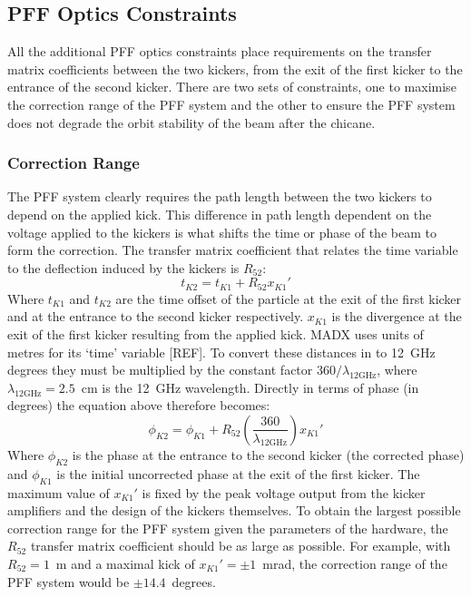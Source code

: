 \subsection{PFF Optics Constraints}
\label{ss:pffOpticsReqs}

All the additional PFF optics constraints place requirements on the transfer matrix coefficients between the two kickers, from the exit of the first kicker to the entrance of the second kicker. There are two sets of constraints, one to maximise the correction range of the PFF system and the other to ensure the PFF system does not degrade the orbit stability of the beam after the chicane.

\subsubsection{Correction Range}

The PFF system clearly requires the path length between the two kickers to depend on the applied kick. This difference in path length dependent on the voltage applied to the kickers is what shifts the time or phase of the beam to form the correction. The transfer matrix coefficient that relates the time variable to the deflection induced by the kickers is \(R_{52}\):
\begin{equation}
t_{K2} = t_{K1} + R_{52}x_{K1}'
\end{equation}
Where \(t_{K1}\) and \(t_{K2}\) are the time offset of the particle at the exit of the first kicker and at the entrance to the second kicker respectively. \(x_{K1}\) is the divergence at the exit of the first kicker resulting from the applied kick. MADX uses units of metres for its `time' variable [REF]. To convert these distances in to 12~GHz degrees they must be multiplied by the constant factor \(360/\lambda_{\mathrm{12GHz}}\), where \(\lambda_{\mathrm{12GHz}} = 2.5\)~cm is the 12~GHz wavelength. Directly in terms of phase (in degrees) the equation above therefore becomes:
\begin{equation}
\phi_{K2} = \phi_{K1} + R_{52}\left(\frac{360}{\lambda_{\mathrm{12GHz}}}\right)x_{K1}'
\end{equation}
Where \(\phi_{K2}\) is the phase at the entrance to the second kicker (the corrected phase) and \(\phi_{K1}\) is the initial uncorrected phase at the exit of the first kicker. The maximum value of \(x_{K1}'\) is fixed by the peak voltage output from the kicker amplifiers and the design of the kickers themselves. To obtain the largest possible correction range for the PFF system given the parameters of the hardware, the \(R_{52}\) transfer matrix coefficient should be as large as possible. For example, with \(R_{52} = 1\)~m and a maximal kick of \(x_{K1}' = \pm 1\)~mrad, the correction range of the PFF system would be \(\pm 14.4\)~degrees.

